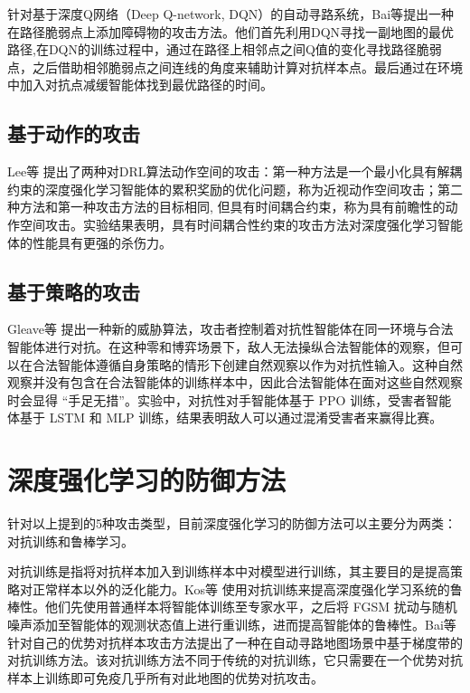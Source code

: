 \documentclass[lettersize,journal]{IEEEtran}
\begin{document}
 \quad 针对基于深度Q网络（Deep Q-network, DQN）的自动寻路系统，Bai等\cite{bai2018adversarial}提出一种在路径脆弱点上添加障碍物的攻击方法。他们首先利用DQN寻找一副地图的最优路径,在DQN的训练过程中，通过在路径上相邻点之间Q值的变化寻找路径脆弱点，之后借助相邻脆弱点之间连线的角度来辅助计算对抗样本点。最后通过在环境中加入对抗点减缓智能体找到最优路径的时间。
 
 \subsection{基于动作的攻击}
 
 \quad Lee等\cite{lee2020spatiotemporally} 提出了两种对DRL算法动作空间的攻击：第一种方法是一个最小化具有解耦约束的深度强化学习智能体的累积奖励的优化问题，称为近视动作空间攻击；第二种方法和第一种攻击方法的目标相同, 但具有时间耦合约束，称为具有前瞻性的动作空间攻击。实验结果表明，具有时间耦合性约束的攻击方法对深度强化学习智能体的性能具有更强的杀伤力。
 \subsection{基于策略的攻击}
 
 \quad Gleave等\cite{gleave2019adversarial} 提出一种新的威胁算法，攻击者控制着对抗性智能体在同一环境与合法智能体进行对抗。在这种零和博弈场景下，敌人无法操纵合法智能体的观察，但可以在合法智能体遵循自身策略的情形下创建自然观察以作为对抗性输入。这种自然观察并没有包含在合法智能体的训练样本中，因此合法智能体在面对这些自然观察时会显得 “手足无措”。实验中，对抗性对手智能体基于 PPO 训练，受害者智能体基于 LSTM 和 MLP 训练，结果表明敌人可以通过混淆受害者来赢得比赛。
 

\section{深度强化学习的防御方法}
\quad 针对以上提到的5种攻击类型，目前深度强化学习的防御方法可以主要分为两类：对抗训练和鲁棒学习。

\quad 对抗训练是指将对抗样本加入到训练样本中对模型进行训练，其主要目的是提高策略对正常样本以外的泛化能力。Kos等\cite{kos2017delving} 使用对抗训练来提高深度强化学习系统的鲁棒性。他们先使用普通样本将智能体训练至专家水平，之后将 FGSM 扰动与随机噪声添加至智能体的观测状态值上进行重训练，进而提高智能体的鲁棒性。Bai等\cite{bai2018adversarial}针对自己的优势对抗样本攻击方法提出了一种在自动寻路地图场景中基于梯度带的对抗训练方法。该对抗训练方法不同于传统的对抗训练，它只需要在一个优势对抗样本上训练即可免疫几乎所有对此地图的优势对抗攻击。
\end{document}

